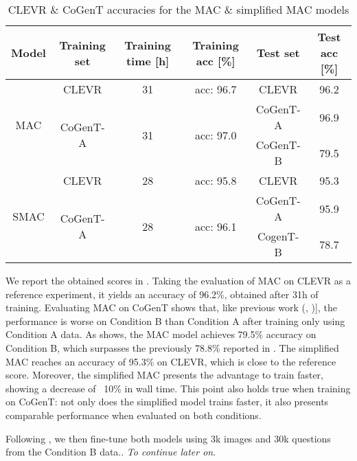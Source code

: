 \begin{table}[]
	\caption{CLEVR \& CoGenT accuracies for the MAC \& simplified MAC models}
	\centering
	\begin{tabular}{cccccc}
		\toprule
		Model                 & Training set                & Training time [h] & Training acc [\%]          & Test set & Test acc [\%] \\
		\midrule
		\multirow{3}{*}{MAC}  & CLEVR                       & 31                                   & acc: 96.7                  & CLEVR    & 96.2          \\
		\cmidrule{2-6} 
		& \multirow{2}{*}{CoGenT-A} & \multirow{2}{*}{31}                    & \multirow{2}{*}{acc: 97.0} & CoGenT-A & 96.9         \\
		\cmidrule{5-6} 
		&                             &                                         &                              & CoGenT-B & 79.5          \\
		\midrule
		\multirow{3}{*}{SMAC} & CLEVR                       & 28                                     & acc: 95.8               & CLEVR    & 95.3          \\
		\cmidrule{2-6} 
		& \multirow{2}{*}{CoGenT-A}   & \multirow{2}{*}{28}                    & \multirow{2}{*}{acc: 96.1} & CoGenT-A & 95.9          \\
		\cmidrule{5-6} 
		&                             &                                         &                              & CogenT-B & 78.7          \\
		\bottomrule
	\end{tabular}
	\label{results}
\end{table}

We report the obtained scores in . Taking the evaluation of MAC on CLEVR as a reference experiment, it yields an accuracy of 96.2\%, obtained after 31h of training.
Evaluating MAC on CoGenT shows that, like previous work (\cite{johnson2017inferring}, \cite{mascharka2018transparency})], the performance is worse on Condition B than Condition A after training only using Condition A data. As  shows, the MAC model achieves 79.5\% accuracy on Condition B, which surpasses the previously 78.8\% reported in \cite{perez2017film}. 
The simplified MAC reaches an accuracy of 95.3\% on CLEVR, which is close to the reference score. Moreover, the simplified MAC presents the advantage to train faster, showing a decrease of ~10\% in wall time. This point also holds true when training on CoGenT: not only does the simplified model trains faster, it also presents comparable performance when evaluated on both conditions.

Following \cite{johnson2017inferring}, we then fine-tune both models using 3k images and 30k questions from the Condition B data.. \textit{To continue later on}.

